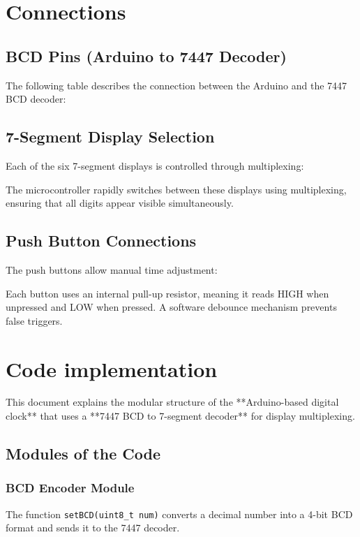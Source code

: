 \documentclass{article}
\begin{document}
\section{Connections}
\subsection{BCD Pins (Arduino to 7447 Decoder)}
The following table describes the connection between the Arduino and the 7447 BCD decoder:



\subsection{7-Segment Display Selection}
Each of the six 7-segment displays is controlled through multiplexing:



The microcontroller rapidly switches between these displays using multiplexing, ensuring that all digits appear visible simultaneously.
\subsection{Push Button Connections}
The push buttons allow manual time adjustment:


Each button uses an internal pull-up resistor, meaning it reads HIGH when unpressed and LOW when pressed. A software debounce mechanism prevents false triggers.







\section{Code implementation}
This document explains the modular structure of the **Arduino-based digital clock** that uses a **7447 BCD to 7-segment decoder** for display multiplexing.

\subsection{Modules of the Code}

\subsubsection{BCD Encoder Module}
The function \texttt{setBCD(uint8\_t num)} converts a decimal number into a 4-bit BCD format and sends it to the 7447 decoder.
\end{document}
